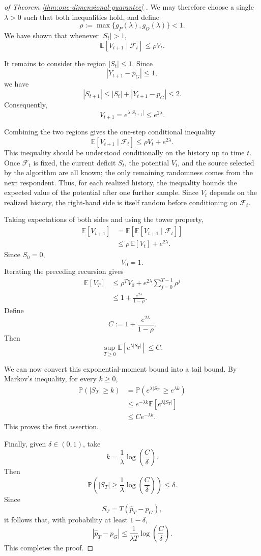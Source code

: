\documentclass[twoside]{article}
\begin{document}
\begin{proof}[of Theorem \ref{thm:one-dimensional-guarantee} ]
We may therefore choose a single \(\lambda>0\) such that both inequalities
hold, and define
\[
\rho
:=
\max\{g_P(\lambda),g_O(\lambda)\}<1.
\]
We have shown that whenever \(|S_t|>1\),
\[
\mathbb E[V_{t+1}\mid\mathcal F_t]
\leq
\rho V_t.
\]

It remains to consider the region \(|S_t|\leq1\). Since
\[
|Y_{t+1}-p_G|\leq1,
\]
we have
\[
|S_{t+1}|
\leq
|S_t|+|Y_{t+1}-p_G|
\leq2.
\]
Consequently,
\[
V_{t+1}
=
e^{\lambda|S_{t+1}|}
\leq
e^{2\lambda}.
\]

Combining the two regions gives the one-step conditional inequality
\[
\mathbb E[V_{t+1}\mid\mathcal F_t]
\leq
\rho V_t+e^{2\lambda}.
\]
This inequality should be understood conditionally on the history up to time
\(t\). Once \(\mathcal F_t\) is fixed, the current deficit \(S_t\), the
potential \(V_t\), and the source selected by the algorithm are all known; the
only remaining randomness comes from the next respondent. Thus, for each
realized history, the inequality bounds the expected value of the potential
after one further sample. Since \(V_t\) depends on the realized history, the
right-hand side is itself random before conditioning on \(\mathcal F_t\).

Taking expectations of both sides and using the tower property,
\[
\begin{aligned}
\mathbb E[V_{t+1}]
&=
\mathbb E\left[
\mathbb E[V_{t+1}\mid\mathcal F_t]
\right] \\
&\leq
\rho\,\mathbb E[V_t]
+
e^{2\lambda}.
\end{aligned}
\]
Since \(S_0=0\),
\[
V_0=1.
\]
Iterating the preceding recursion gives
\[
\begin{aligned}
\mathbb E[V_T]
&\leq
\rho^T V_0
+
e^{2\lambda}
\sum_{j=0}^{T-1}\rho^j \\
&\leq
1+\frac{e^{2\lambda}}{1-\rho}.
\end{aligned}
\]
Define
\[
C
:=
1+\frac{e^{2\lambda}}{1-\rho}.
\]
Then
\[
\sup_{T\geq0}
\mathbb E\left[e^{\lambda|S_T|}\right]
\leq C.
\]

We can now convert this exponential-moment bound into a tail bound. By
Markov's inequality, for every \(k\geq0\),
\[
\begin{aligned}
\mathbb P(|S_T|\geq k)
&=
\mathbb P\left(
e^{\lambda|S_T|}
\geq
e^{\lambda k}
\right) \\
&\leq
e^{-\lambda k}
\mathbb E\left[e^{\lambda|S_T|}\right] \\
&\leq
Ce^{-\lambda k}.
\end{aligned}
\]
This proves the first assertion.

Finally, given \(\delta\in(0,1)\), take
\[
k
=
\frac{1}{\lambda}
\log\left(\frac{C}{\delta}\right).
\]
Then
\[
\mathbb P\left(
|S_T|
\geq
\frac{1}{\lambda}
\log\left(\frac{C}{\delta}\right)
\right)
\leq
\delta.
\]
Since
\[
S_T
=
T(\widehat p_T-p_G),
\]
it follows that, with probability at least \(1-\delta\),
\[
\left|
\widehat p_T-p_G
\right|
\leq
\frac{1}{\lambda T}
\log\left(\frac{C}{\delta}\right).
\]
This completes the proof.
\end{proof}
\end{document}
